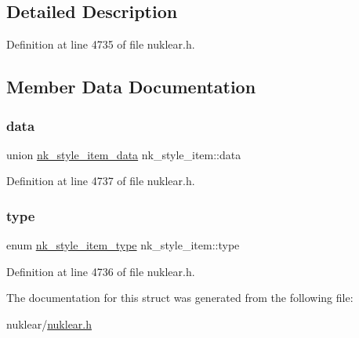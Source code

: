 \subsection{Detailed Description}


Definition at line 4735 of file nuklear.\+h.



\subsection{Member Data Documentation}
\mbox{\label{structnk__style__item_ad96b1cf96a4ec74e9229e8986a03cc4f}} 
\subsubsection{\texorpdfstring{data}{data}}
{\footnotesize\ttfamily union \mbox{\hyperlink{unionnk__style__item__data}{nk\+\_\+style\+\_\+item\+\_\+data}} nk\+\_\+style\+\_\+item\+::data}



Definition at line 4737 of file nuklear.\+h.

\mbox{\label{structnk__style__item_a743eeb49a50622632466d9300faaf448}} 
\subsubsection{\texorpdfstring{type}{type}}
{\footnotesize\ttfamily enum \mbox{\hyperlink{nuklear_8h_a3674d18d76a677a8315f60351fad473c}{nk\+\_\+style\+\_\+item\+\_\+type}} nk\+\_\+style\+\_\+item\+::type}



Definition at line 4736 of file nuklear.\+h.



The documentation for this struct was generated from the following file\+:\begin{DoxyCompactItemize}
\item 
nuklear/\mbox{\hyperlink{nuklear_8h}{nuklear.\+h}}\end{DoxyCompactItemize}
